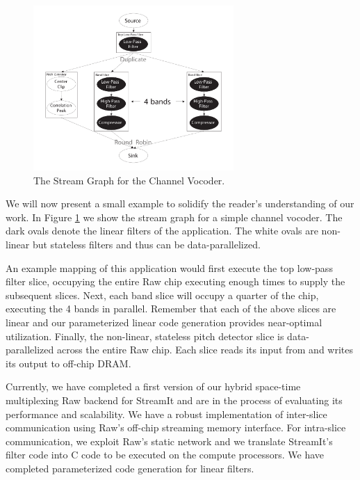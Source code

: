 \documentclass{csailabstractbook}
\begin{document}
\begin{figure}[tbh]
	\vspace{-.2in}
  \centerline{\includegraphics[width=3.0in]{mgordon_figure1.pdf}}
	\vspace{-.2in}
  \caption{The Stream Graph for the Channel Vocoder.}
	\vspace{-.2in}
  \label{streamgraph}
\end{figure}


   
We will now present a small example to solidify the reader's
understanding of our work.  In Figure \ref{streamgraph} we show the
stream graph for a simple channel vocoder.  The dark ovals denote
the linear filters of the application.  The white ovals are non-linear
but stateless filters and thus can be data-parallelized.  

An example mapping of this application would first execute the top
low-pass filter slice, occupying the entire Raw chip executing enough
times to supply the subsequent slices. Next, each band slice will
occupy a quarter of the chip, executing the 4 bands in parallel.  Remember
that each of the above slices are linear and our parameterized linear
code generation provides near-optimal utilization. Finally, the
non-linear, stateless pitch detector slice is data-parallelized across
the entire Raw chip. Each slice reads its input from and writes its output
to off-chip DRAM.
 
Currently, we have completed a first version of our hybrid space-time
multiplexing Raw backend for StreamIt and are in the process of
evaluating its performance and scalability.  We have a robust
implementation of inter-slice communication using Raw's off-chip
streaming memory interface.  For intra-slice communication, we exploit
Raw's static network and we translate StreamIt's filter code into C
code to be executed on the compute processors.  We have completed
parameterized code generation for linear filters.   
\end{document}
